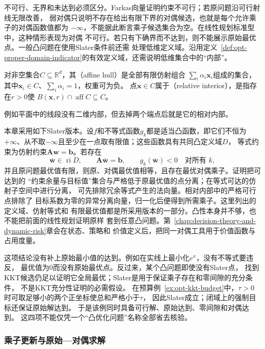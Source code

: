 不可行、无界和未达到必须区分。Farkas向量证明约束不可行；若原问题沿可行射线无限改善，
弱对偶只说明不存在给出有限下界的对偶候选，也就是每个允许乘子的对偶函数值都为
$-\infty$，不能据此断言乘子候选集合为空。在线性规划标准型中，这种情形表现为对偶
不可行。若只有下确界而不达到，则不能展示原始最优点。一般凸问题在使用Slater条件前还需
处理低维定义域。沿用定义~\ref{def:opt-proper-domain-indicator}的有效定义域，还需说明低维集合中的“内部”。
\begin{definition}[仿射包与相对内部]
\label{def:opt-affine-hull-relative-interior}
对非空集合$C\subseteq\mathbb R^d$，其（affine hull）是全部有限仿射组合
$\sum_i\alpha_i\bm x_i$组成的集合，其中$\bm x_i\in C$、$\sum_i\alpha_i=1$，权重可为负。
点$\bm x\in C$属于（relative interior），是指存在$r>0$使
$B(\bm x,r)\cap\operatorname{aff}C\subseteq C$。
\end{definition}例如平面中的线段没有二维内部，但去掉两个端点后就是它的相对内部。

本章采用如下Slater版本。设$f$和不等式函数$g_k$都是适当凸函数，即它们不恒为
$+\infty$、从不取$-\infty$且至少在一点取有限值；这些函数具有共同凸定义域$D$，
等式约束为仿射约束$\bm{A}\bm{w}=\bm{b}$。若存在
\[
  \bar{\bm{w}}\in\operatorname{ri}D,\qquad
  \bm{A}\bar{\bm{w}}=\bm{b},\qquad
  g_k(\bar{\bm{w}})<0\quad\text{对所有 }k,
\]
并且原问题最优值有限，则原、对偶最优值相等，且存在最优对偶乘子。证明把可达到的
“约束余量与目标值”集合与严格低于原最优值的点分离；在等式可达的仿射子空间中进行分离，
可先排除冗余等式产生的法向量。相对内部中的严格可行点排除了
目标系数为零的异常分离向量，归一化后便得到所需乘子。这里列出的定义域、仿射等式和
有限最优值都是所采用版本的一部分。凸性本身并不够，也不能把前面的线性规划证明原样
套到任意凸问题。第~\ref{chap:decision-theory-and-dynamic-risk}章会在状态、策略和
价值定义后，把同一对偶工具用于价值函数与占用度量。

这项结论没有补上原始最小值的达到。例如在实线上最小化$e^x$，没有不等式要违反，
最优值为$0$而没有原始最优点。反过来，某个凸问题即使没有Slater点，
找到KKT候选仍足以证明它全局最优；Slater是用于保证乘子存在和零间隙的充分条件，
不是KKT充分性证明的必需假设。
在预算例~\ref{ex:opt-kkt-budget}中，$\tau>0$时可取足够小的两个正坐标使总和严格小于$\tau$，
因此Slater成立；闭域上的强制目标还保证原始解达到。
于是该例同时具备可行解、原始达到、零间隙和对偶达到。
这四项不能仅凭一个“凸优化问题”名称全部省去核验。

\subsubsection{乘子更新与原始—对偶求解}
\label{sec:opt-multiplier-updates}

